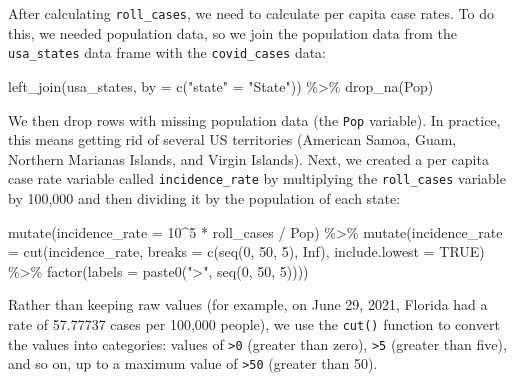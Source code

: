 \documentclass[
]{book}
\newenvironment{Shaded}{\begin{snugshade}}{\end{snugshade}}
\newcommand{\AttributeTok}[1]{\textcolor[rgb]{0.77,0.63,0.00}{#1}}
\newcommand{\ConstantTok}[1]{\textcolor[rgb]{0.00,0.00,0.00}{#1}}
\newcommand{\DecValTok}[1]{\textcolor[rgb]{0.00,0.00,0.81}{#1}}
\newcommand{\FunctionTok}[1]{\textcolor[rgb]{0.00,0.00,0.00}{#1}}
\newcommand{\NormalTok}[1]{#1}
\newcommand{\OtherTok}[1]{\textcolor[rgb]{0.56,0.35,0.01}{#1}}
\newcommand{\SpecialCharTok}[1]{\textcolor[rgb]{0.00,0.00,0.00}{#1}}
\newcommand{\StringTok}[1]{\textcolor[rgb]{0.31,0.60,0.02}{#1}}
\begin{document}
After calculating \texttt{roll\_cases}, we need to calculate per capita case rates. To do this, we needed population data, so we join the population data from the \texttt{usa\_states} data frame with the \texttt{covid\_cases} data:

\begin{Shaded}
\begin{Highlighting}[]
\FunctionTok{left\_join}\NormalTok{(usa\_states,}
          \AttributeTok{by =} \FunctionTok{c}\NormalTok{(}\StringTok{"state"} \OtherTok{=} \StringTok{"State"}\NormalTok{)) }\SpecialCharTok{\%\textgreater{}\%}
  \FunctionTok{drop\_na}\NormalTok{(Pop)}
\end{Highlighting}
\end{Shaded}

We then drop rows with missing population data (the \texttt{Pop} variable). In practice, this means getting rid of several US territories (American Samoa, Guam, Northern Marianas Islands, and Virgin Islands).
Next, we created a per capita case rate variable called \texttt{incidence\_rate} by multiplying the \texttt{roll\_cases} variable by 100,000 and then dividing it by the population of each state:

\begin{Shaded}
\begin{Highlighting}[]
\FunctionTok{mutate}\NormalTok{(}\AttributeTok{incidence\_rate =} \DecValTok{10}\SpecialCharTok{\^{}}\DecValTok{5} \SpecialCharTok{*}\NormalTok{ roll\_cases }\SpecialCharTok{/}\NormalTok{ Pop) }\SpecialCharTok{\%\textgreater{}\%}
  \FunctionTok{mutate}\NormalTok{(}\AttributeTok{incidence\_rate =} \FunctionTok{cut}\NormalTok{(incidence\_rate,}
                              \AttributeTok{breaks =} \FunctionTok{c}\NormalTok{(}\FunctionTok{seq}\NormalTok{(}\DecValTok{0}\NormalTok{, }\DecValTok{50}\NormalTok{, }\DecValTok{5}\NormalTok{), }\ConstantTok{Inf}\NormalTok{),}
                              \AttributeTok{include.lowest =} \ConstantTok{TRUE}\NormalTok{) }\SpecialCharTok{\%\textgreater{}\%}
           \FunctionTok{factor}\NormalTok{(}\AttributeTok{labels =} \FunctionTok{paste0}\NormalTok{(}\StringTok{"\textgreater{}"}\NormalTok{, }\FunctionTok{seq}\NormalTok{(}\DecValTok{0}\NormalTok{, }\DecValTok{50}\NormalTok{, }\DecValTok{5}\NormalTok{))))}
\end{Highlighting}
\end{Shaded}

Rather than keeping raw values (for example, on June 29, 2021, Florida had a rate of 57.77737 cases per 100,000 people), we use the \texttt{cut()} function to convert the values into categories: values of \texttt{\textgreater{}0} (greater than zero), \texttt{\textgreater{}5} (greater than five), and so on, up to a maximum value of \texttt{\textgreater{}50} (greater than 50).
\end{document}
